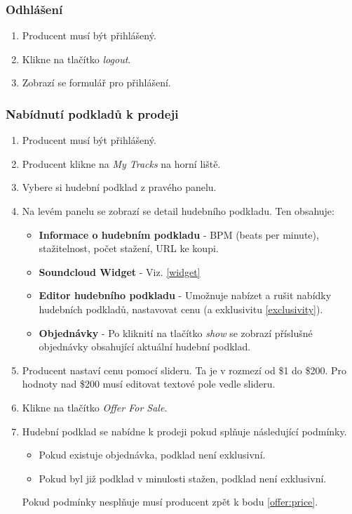 \documentclass[12pt]{article}
\begin{document}
\subsubsection{Odhlášení}

\begin{enumerate}
\item Producent musí být přihlášený.
\item Klikne na tlačítko \emph{logout}.
\item Zobrazí se formulář pro přihlášení.
\end{enumerate}

\subsubsection{Nabídnutí podkladů k prodeji}
\begin{enumerate}
\item Producent musí být přihlášený.
\item Producent klikne na \emph{My Tracks} na horní liště.
\item Vybere si hudební podklad z pravého panelu.

\item Na levém panelu se zobrazí se detail hudebního podkladu. Ten obsahuje:

  \begin{itemize}
  \item{\textbf{Informace o hudebním podkladu}} - BPM (beats per minute), stažitelnost, počet stažení, URL ke koupi.
  \item{\textbf{Soundcloud Widget}} - Viz. \ref{widget}
  \item{\textbf{Editor hudebního podkladu}} - Umožnuje nabízet a rušit nabídky hudebních podkladů, nastavovat cenu (a exklusivitu \ref{exclusivity}).
  \item{\textbf{Objednávky}} - Po kliknití na tlačítko \emph{show} se zobrazí příslušné objednávky obsahující aktuální hudební podklad.
  \end{itemize}

\item \label{offer:price} Producent nastaví cenu pomocí slideru. Ta je v rozmezí od \$1 do \$200. Pro hodnoty nad \$200 musí editovat textové pole vedle slideru.
\item Klikne na tlačítko \emph{Offer For Sale}.
\item Hudební podklad se nabídne k prodeji pokud splňuje následující podmínky.

  \begin{itemize}
  \item Pokud existuje objednávka, podklad není exklusivní.
  \item Pokud byl již podklad v minulosti stažen, podklad není exklusivní.
  \end{itemize}

  Pokud podmínky nesplňuje musí producent zpět k bodu \ref{offer:price}.

\end{enumerate}
\end{document}
